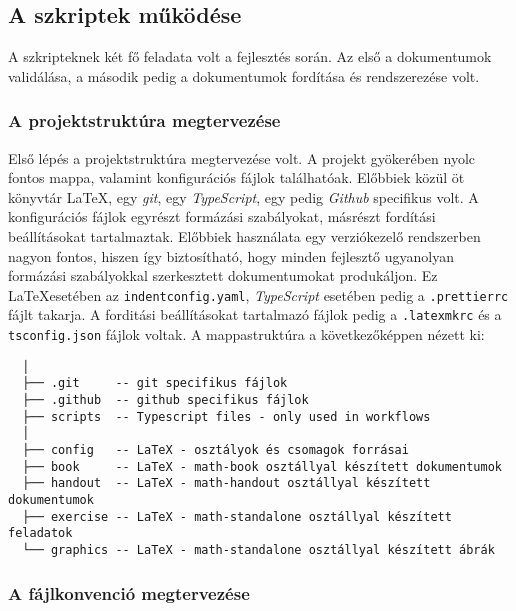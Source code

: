\subsection{A szkriptek működése}

A szkripteknek két fő feladata volt a fejlesztés során. Az első a dokumentumok
validálása, a második pedig a dokumentumok fordítása és rendszerezése volt.

\subsubsection{A projektstruktúra megtervezése}

Első lépés a projektstruktúra megtervezése volt. A projekt gyökerében nyolc
fontos mappa, valamint konfigurációs fájlok találhatóak. Előbbiek közül öt
könyvtár \LaTeX, egy \textit{git}, egy \textit{TypeScript}, egy pedig
\textit{Github} specifikus volt. A konfigurációs fájlok egyrészt formázási
szabályokat, másrészt fordítási beállításokat tartalmaztak. Előbbiek használata
egy verziókezelő rendszerben nagyon fontos, hiszen így biztosítható, hogy minden
fejlesztő ugyanolyan formázási szabályokkal szerkesztett dokumentumokat
produkáljon. Ez \LaTeX esetében az \texttt{indentconfig.yaml},
\textit{TypeScript} esetében pedig a \texttt{.prettierrc} fájlt takarja.
A forditási beállításokat tartalmazó fájlok pedig a \texttt{.latexmkrc} és a
\texttt{tsconfig.json} fájlok voltak. A mappastruktúra a következőképpen
nézett ki:

\begin{lstlisting}
  │
  ├── .git     -- git specifikus fájlok
  ├── .github  -- github specifikus fájlok
  ├── scripts  -- Typescript files - only used in workflows
  │
  ├── config   -- LaTeX - osztályok és csomagok forrásai
  ├── book     -- LaTeX - math-book osztállyal készített dokumentumok
  ├── handout  -- LaTeX - math-handout osztállyal készített dokumentumok
  ├── exercise -- LaTeX - math-standalone osztállyal készített feladatok
  └── graphics -- LaTeX - math-standalone osztállyal készített ábrák
\end{lstlisting}

\subsubsection{A fájlkonvenció megtervezése}

